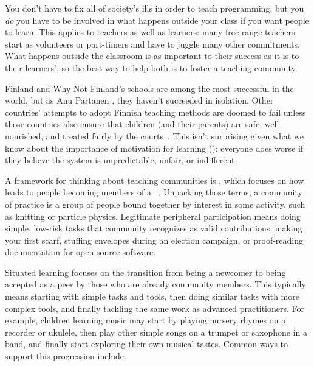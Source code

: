 
You don't have to fix all of society's ills in order to teach programming,
but you \emph{do} you have to be involved in
what happens outside your class if you want people to learn.
This applies to teachers as well as learners:
many free-range teachers start as volunteers or part-timers
and have to juggle many other commitments.
What happens outside the classroom is as important to their success
as it is to their learners',
so the best way to help both is to foster a teaching community.

\begin{aside}{Finland and Why Not}
  Finland's schools are among the most successful in the world,
  but as Anu Partanen ,
  they haven't succeeded in isolation.
  Other countries' attempts to adopt Finnish teaching methods are doomed to fail
  unless those countries also ensure that children (and their parents) are safe,
  well nourished,
  and treated fairly by the courts~\cite{Sahl2015,Wilk2011}.
  This isn't surprising given what we know about the importance of motivation for learning ():
  everyone does worse if they believe the system is unpredictable, unfair, or indifferent.
\end{aside}

A framework for thinking about teaching communities is ,
which focuses on how 
leads to people becoming members of
a ~\cite{Weng2015}.
Unpacking those terms,
a community of practice is a group of people bound together by interest in some activity,
such as knitting or particle physics.
Legitimate peripheral participation means doing simple, low-risk tasks
that community recognizes as valid contributions:
making your first scarf,
stuffing envelopes during an election campaign,
or proof-reading documentation for open source software.

Situated learning focuses on the transition from being a newcomer
to being accepted as a peer by those who are already community members.
This typically means starting with simple tasks and tools,
then doing similar tasks with more complex tools,
and finally tackling the same work as advanced practitioners.
For example,
children learning music may start by playing nursery rhymes on a recorder or ukulele,
then play other simple songs on a trumpet or saxophone in a band,
and finally start exploring their own musical tastes.
Common ways to support this progression include:

